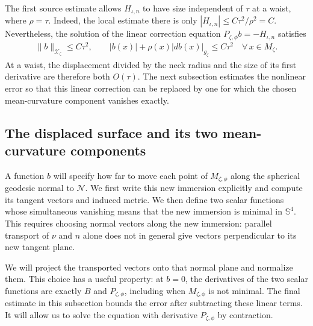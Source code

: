\documentclass[a4paper,11pt,oneside,reqno]{amsart}
\numberwithin{equation}{section}
\theoremstyle{definition}
\begin{document}
The first source estimate allows $H_{\iota,n}$ to have
size independent of $\tau$ at a waist, where $\rho=\tau$.
Indeed, the local estimate there is only
$|H_{\iota,n}|\leq C\tau^2/\rho^2=C$.
Nevertheless, the solution of the linear correction equation
$P_{\zeta,\phi}b=-H_{\iota,n}$ satisfies
%
\begin{align*}
    \|b\|_{\mathcal X_\zeta}\leq C\tau^2,
    \qquad
    |b(x)|+\rho(x)|db(x)|_{g_\zeta}
    \leq C\tau^2
    \quad\forall\,x\in M_\zeta.
\end{align*}
%
At a waist, the displacement divided by the neck radius
and the size of its first derivative are therefore both
$O(\tau)$. The next subsection estimates the nonlinear
error so that this linear correction can be replaced by
one for which the chosen mean-curvature component vanishes
exactly.

\subsection{The displaced surface and its two mean-curvature components}

A function $b$ will specify how far to move each point of
$M_{\zeta,\phi}$ along the spherical geodesic normal to
$\mathcal N$. We first write this new immersion explicitly
and compute its tangent vectors and induced metric. We then
define two scalar functions whose simultaneous vanishing
means that the new immersion is minimal in $\mathbb S^4$.
This requires choosing normal vectors along the new immersion:
parallel transport of $\nu$ and $n$ alone does not in general
give vectors perpendicular to its new tangent plane.

We will project the transported vectors onto that normal
plane and normalize them. This choice has a useful property:
at $b=0$, the derivatives of the two scalar functions are
exactly $B$ and $P_{\zeta,\phi}$, including when
$M_{\zeta,\phi}$ is not minimal. The final estimate in this
subsection bounds the error after subtracting these linear
terms. It will allow us to solve the equation with derivative
$P_{\zeta,\phi}$ by contraction.
\end{document}
